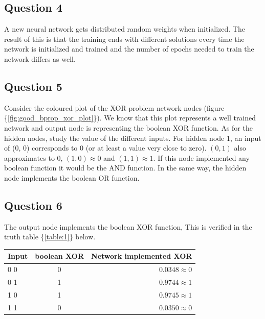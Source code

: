 \documentclass[a4paper]{article}
\begin{document}
\subsection*{Question 4}
A new neural network gets distributed random weights 
when initialized. The result of this is that the training ends with different 
solutions every time the network is initialized and trained and the 
number of epochs needed to train the network differs as well. 
\subsection*{Question 5}
Consider the coloured plot of the XOR problem 
network nodes (figure \{\ref{fig:good_bprop_xor_plot}\}). We 
know that this plot represents a well trained network and output node is 
representing the boolean XOR function. As for the hidden nodes, study the value 
of the different inputs. For hidden node 1, an input of (0, 0) corresponds to 0 (or 
at least a value very close to zero). $(0, 1)$ also approximates to $0$, $(1, 0) \approx 0$ and 
$(1, 1) \approx 1$. If this node implemented any boolean function it would be the AND function.
In the same way, the hidden node implements the boolean OR function. 
\subsection*{Question 6}
The output node implements the boolean XOR function, 
This is verified in the truth table \{\ref{table:1}\} below. 

\begin{center}
	\label{table:1}
    \begin{tabular} {l | c | r }
        Input & boolean XOR & Network implemented XOR \\
		\hline
        0 0 & 0 & $0.0348 \approx 0$\\
        0 1 & 1 & $0.9744 \approx 1$\\
        1 0 & 1 & $0.9745 \approx 1$\\
        1 1 & 0 & $0.0350 \approx 0$\\
    \end{tabular}
\end{center}
\end{document}

